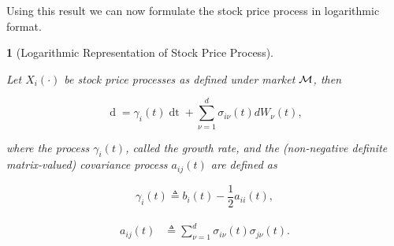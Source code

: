 \documentclass[british]{amsart} \usepackage{lmodern}
\numberwithin{equation}{section} \numberwithin{figure}{section}
\theoremstyle{plain} \newtheorem{thm}{\protect\theoremname}[section]
\theoremstyle{definition} \newtheorem{defn}[thm]{\protect\definitionname}
\theoremstyle{plain} \newtheorem{assumption}[thm]{\protect\assumptionname}
\theoremstyle{plain} \newtheorem{lem}[thm]{\protect\lemmaname}
\theoremstyle{plain} \newtheorem{prop}[thm]{\protect\propositionname}
\theoremstyle{remark} \newtheorem{rem}[thm]{\protect\remarkname}
\theoremstyle{plain} \newtheorem{cor}[thm]{\protect\corollaryname}
\renewcommand{\d}[1]{\mathop{\mathrm{d}{#1}}}
\newcommand{\defeq}{\mathop{\triangleq}} \newcommand{\almostsurely}{\text{a.s.}}
\begin{document}
Using this result we can now formulate the stock price process in logarithmic
format.

\begin{prop} [Logarithmic Representation of Stock Price Process]
  \label{thm:logarithmicrepresentation}

  Let $X_{i}(\cdot)$ be stock price processes as defined under market $\mathcal{M}$,
  then

  \begin{equation}
    \label{eq:dlogX}
        \d{\log{X_{i}(t)}} =
          \gamma_{i}(t) \d{t} +
          \sum_{\nu=1}^{d} \sigma_{i\nu}(t) dW_{\nu}(t),
  \end{equation}

  where the process $\gamma_{i}(t)$, called the \textit{growth rate}, and the
  (non-negative definite matrix-valued) \textit{covariance process} $a_{ij}(t)$
  are defined as

  \begin{equation}
    \label{eq:gamma}
    \gamma_{i}(t)\defeq b_{i}(t)-\frac{1}{2}a_{ii}(t),
  \end{equation}

  \begin{gather}
    \label{eq:covarianceprocess}
    \begin{split}
      a_{ij}(t)
        & \defeq \sum_{\nu=1}^{d}\sigma_{i\nu}(t)\sigma_{j\nu}(t).
    \end{split}
  \end{gather}

\end{prop}
\end{document}
